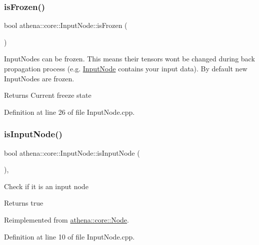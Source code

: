 \subsubsection{\texorpdfstring{is\+Frozen()}{isFrozen()}}
{\footnotesize\ttfamily bool athena\+::core\+::\+Input\+Node\+::is\+Frozen (\begin{DoxyParamCaption}{ }\end{DoxyParamCaption})}

Input\+Nodes can be frozen. This means their tensors won\textquotesingle{}t be changed during back propagation process (e.\+g. \mbox{\hyperlink{classathena_1_1core_1_1_input_node}{Input\+Node}} contains your input data). By default new Input\+Nodes are frozen. \begin{DoxyReturn}{Returns}
Current freeze state 
\end{DoxyReturn}


Definition at line 26 of file Input\+Node.\+cpp.

\mbox{\label{classathena_1_1core_1_1_input_node_a2548b569a336b75c0005295833052979}} 
\subsubsection{\texorpdfstring{is\+Input\+Node()}{isInputNode()}}
{\footnotesize\ttfamily bool athena\+::core\+::\+Input\+Node\+::is\+Input\+Node (\begin{DoxyParamCaption}{ }\end{DoxyParamCaption})\hspace{0.3cm}{\ttfamily [override]}, {\ttfamily [virtual]}}

Check if it is an input node \begin{DoxyReturn}{Returns}
true 
\end{DoxyReturn}


Reimplemented from \mbox{\hyperlink{classathena_1_1core_1_1_node_a6ae012557fc6b29127366b1e92801d4a}{athena\+::core\+::\+Node}}.



Definition at line 10 of file Input\+Node.\+cpp.

\mbox{\label{classathena_1_1core_1_1_input_node_a45311e1bbff5dd28df3c3877aaa10109}} 
